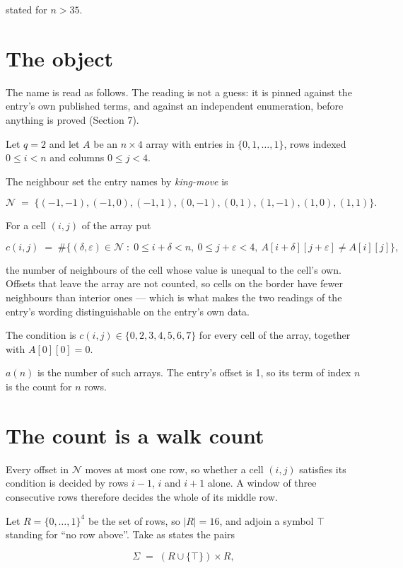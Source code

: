 \documentclass[11pt]{article}
\theoremstyle{definition}
\begin{document}
stated for $n > 35$.

\section{The object}

The name is read as follows. The reading is not a guess: it is pinned against the entry's own published terms, and against an independent enumeration, before anything is proved (Section 7).

Let $q = 2$ and let $A$ be an $n \times 4$ array with entries in $\{0,1,\dots,1\}$, rows indexed $0 \le i < n$ and columns $0 \le j < 4$.

The neighbour set the entry names by {\itshape king-move} is

\[\mathcal{N} \;=\; \{(-1,-1), (-1,0), (-1,1), (0,-1), (0,1), (1,-1), (1,0), (1,1)\}.\]

For a cell $(i,j)$ of the array put

\[c(i,j) \;=\; \#\bigl\{(\delta,\varepsilon)\in\mathcal{N} \;:\; 0\le i+\delta<n,\ 0\le j+\varepsilon<4,\ A[i+\delta][j+\varepsilon] \neq A[i][j]\bigr\},\]

the number of neighbours of the cell whose value is unequal to the cell's own. Offsets that leave the array are not counted, so cells on the border have fewer neighbours than interior ones --- which is what makes the two readings of the entry's wording distinguishable on the entry's own data.

The condition is $c(i,j) \in \{0, 2, 3, 4, 5, 6, 7\}$ for every cell of the array, together with $A[0][0]=0$.

$a(n)$ is the number of such arrays. The entry's offset is 1, so its term of index $n$ is the count for $n$ rows.

\section{The count is a walk count}

Every offset in $\mathcal{N}$ moves at most one row, so whether a cell $(i,j)$ satisfies its condition is decided by rows $i-1$, $i$ and $i+1$ alone. A window of three consecutive rows therefore decides the whole of its middle row.

Let $R = \{0,\dots,1\}^{4}$ be the set of rows, so $|R| = 16$, and adjoin a symbol $\top$ standing for ``no row above''. Take as states the pairs

\[\Sigma \;=\; (R \cup \{\top\}) \times R,\]
\end{document}
